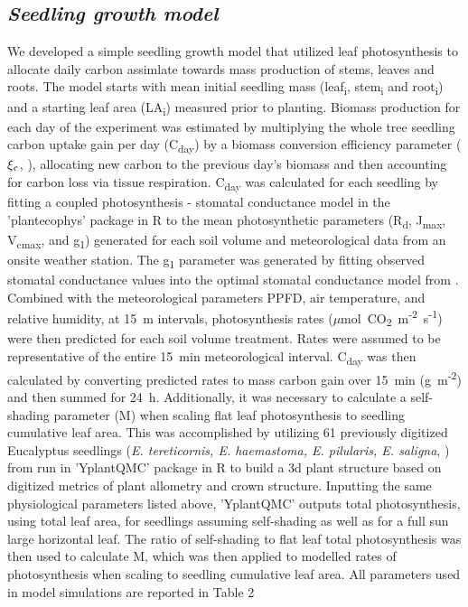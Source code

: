 \documentclass[a4paper]{article}\usepackage[]{graphicx}\usepackage[]{color}
\begin{document}
\subsection*{\textit{Seedling growth model}}
We developed a simple seedling growth model that utilized leaf photosynthesis to allocate daily carbon assimlate towards mass production of stems, leaves and roots. The model starts with mean initial seedling mass (leaf\textsubscript{i}, stem\textsubscript{i} and root\textsubscript{i}) and a starting leaf area (LA\textsubscript{i}) measured prior to planting. Biomass production for each day of the experiment was estimated by multiplying the whole tree seedling carbon uptake gain per day (C\textsubscript{day}) by a biomass conversion efficiency parameter ($\xi\textsubscript{c}$, \cite{zhu2008maximum}), allocating new carbon to the previous day’s biomass and then accounting for carbon loss via tissue respiration. C\textsubscript{day} was calculated for each seedling by fitting a coupled photosynthesis - stomatal conductance model \cite{farquhar1980biochemical,farquhar1982stomatal,medlyn2002temperature} in the 'plantecophys' package in R \cite{plantecophys} to the mean photosynthetic parameters (R\textsubscript{d}, J\textsubscript{max}, V\textsubscript{cmax}, and g\textsubscript{1}) generated for each soil volume and meteorological data from an onsite weather station.  The g\textsubscript{1} parameter was generated by fitting observed stomatal conductance values into the optimal stomatal conductance model from \cite{medlyn2012reconciling}. Combined with the meteorological parameters PPFD, air temperature, and relative humidity, at 15~m intervals, photosynthesis rates ($\mu$mol~CO\textsubscript{2}~m\textsuperscript{-2}~s\textsuperscript{-1}) were then predicted for each soil volume treatment. Rates were assumed to be representative of the entire 15~min meteorological interval. C\textsubscript{day} was then calculated by converting predicted rates to mass carbon gain over 15~min (g~m\textsuperscript{-2}) and then summed for 24~h. Additionally, it was necessary to calculate a self-shading parameter (M) when scaling flat leaf photosynthesis to seedling cumulative leaf area.  This was accomplished by utilizing 61 previously digitized Eucalyptus seedlings (\textit{E. tereticornis, E. haemastoma, E. pilularis, E. saligna}, \cite{duursma2012light}) from run in 'YplantQMC' package in R \cite{yplantqmc} to build a 3d plant structure based on digitized metrics of plant allometry and crown structure. Inputting the same physiological parameters listed above, 'YplantQMC' outputs total photosynthesis, using total leaf area, for seedlings assuming self-shading as well as for a full sun large horizontal leaf.  The ratio of self-shading to flat leaf total photosynthesis was then used to calculate M, which was then applied to modelled rates of photosynthesis when scaling to seedling cumulative leaf area. All parameters used in model simulations are reported in Table 2
\end{document}
